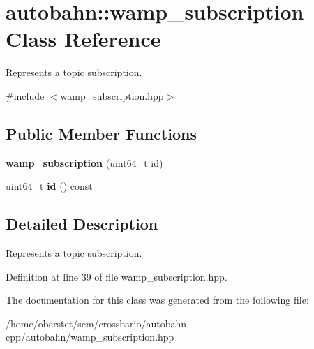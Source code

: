 \hypertarget{classautobahn_1_1wamp__subscription}{}\section{autobahn\+:\+:wamp\+\_\+subscription Class Reference}
\label{classautobahn_1_1wamp__subscription}


Represents a topic subscription.  




{\ttfamily \#include $<$wamp\+\_\+subscription.\+hpp$>$}

\subsection*{Public Member Functions}
\begin{DoxyCompactItemize}
\item 
{\bfseries wamp\+\_\+subscription} (uint64\+\_\+t id)\hypertarget{classautobahn_1_1wamp__subscription_aec058b0aa842cf61187d987071dbbec1}{}\label{classautobahn_1_1wamp__subscription_aec058b0aa842cf61187d987071dbbec1}

\item 
uint64\+\_\+t {\bfseries id} () const \hypertarget{classautobahn_1_1wamp__subscription_ab75a6542d5b7005c4ac394ab91a048b4}{}\label{classautobahn_1_1wamp__subscription_ab75a6542d5b7005c4ac394ab91a048b4}

\end{DoxyCompactItemize}


\subsection{Detailed Description}
Represents a topic subscription. 

Definition at line 39 of file wamp\+\_\+subscription.\+hpp.



The documentation for this class was generated from the following file\+:\begin{DoxyCompactItemize}
\item 
/home/oberstet/scm/crossbario/autobahn-\/cpp/autobahn/wamp\+\_\+subscription.\+hpp\end{DoxyCompactItemize}

